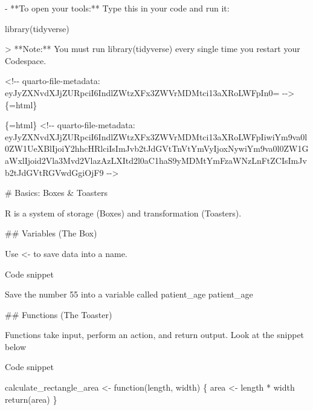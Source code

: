 \documentclass[
  letterpaper,
  DIV=11,
  numbers=noendperiod,
  oneside]{scrreprt}
\newenvironment{Shaded}{\begin{snugshade}}{\end{snugshade}}
\newcommand{\AttributeTok}[1]{\textcolor[rgb]{0.40,0.45,0.13}{#1}}
\newcommand{\FunctionTok}[1]{\textcolor[rgb]{0.28,0.35,0.67}{#1}}
\newcommand{\InformationTok}[1]{\textcolor[rgb]{0.37,0.37,0.37}{#1}}
\newcommand{\NormalTok}[1]{\textcolor[rgb]{0.00,0.23,0.31}{#1}}
\newcommand{\SpecialStringTok}[1]{\textcolor[rgb]{0.13,0.47,0.30}{#1}}
\begin{document}
\begin{Shaded}
\begin{Highlighting}[numbers=left,,]
\SpecialStringTok{{-}   }\NormalTok{**To open your tools:** Type this in your code and run it:}

    \InformationTok{\textasciigrave{}\textasciigrave{}\textasciigrave{}         }
\InformationTok{    library(tidyverse) }
\InformationTok{    \textasciigrave{}\textasciigrave{}\textasciigrave{}}

\AttributeTok{\textgreater{} **Note:** You must run }\InformationTok{\textasciigrave{}library(tidyverse)\textasciigrave{}}\AttributeTok{ every single time you restart your Codespace.}


\InformationTok{\textasciigrave{}\textless{}!{-}{-} quarto{-}file{-}metadata: eyJyZXNvdXJjZURpciI6IndlZWtzXFx3ZWVrMDMtci13aXRoLWFpIn0= {-}{-}\textgreater{}\textasciigrave{}}\NormalTok{\{=html\}}

\InformationTok{\textasciigrave{}\textasciigrave{}\textasciigrave{}\{=html\}}
\InformationTok{\textless{}!{-}{-} quarto{-}file{-}metadata: eyJyZXNvdXJjZURpciI6IndlZWtzXFx3ZWVrMDMtci13aXRoLWFpIiwiYm9va0l0ZW1UeXBlIjoiY2hhcHRlciIsImJvb2tJdGVtTnVtYmVyIjoxNywiYm9va0l0ZW1GaWxlIjoid2Vla3Mvd2VlazAzLXItd2l0aC1haS9yMDMtYmFzaWNzLnFtZCIsImJvb2tJdGVtRGVwdGgiOjF9 {-}{-}\textgreater{}}
\InformationTok{\textasciigrave{}\textasciigrave{}\textasciigrave{}}

\FunctionTok{\# Basics: Boxes \& Toasters }


\NormalTok{R is a system of storage (Boxes) and transformation (Toasters).}

\FunctionTok{\#\# Variables (The Box)}

\NormalTok{Use }\InformationTok{\textasciigrave{}\textless{}{-}\textasciigrave{}}\NormalTok{ to save data into a name.}

\NormalTok{Code snippet}

\InformationTok{\textasciigrave{}\textasciigrave{}\textasciigrave{}         }
\InformationTok{Save the number 55 into a variable called patient\_age patient\_age}
\InformationTok{\textasciigrave{}\textasciigrave{}\textasciigrave{}}

\FunctionTok{\#\# Functions (The Toaster)}

\NormalTok{Functions take input, perform an action, and return output. Look at the snippet below}

\NormalTok{Code snippet}

\InformationTok{\textasciigrave{}\textasciigrave{}\textasciigrave{}         }
\InformationTok{calculate\_rectangle\_area \textless{}{-} function(length, width) \{}
\InformationTok{  area \textless{}{-} length * width}
\InformationTok{  return(area)}
\InformationTok{\}}


\end{Highlighting}
\end{Shaded}
\end{document}
